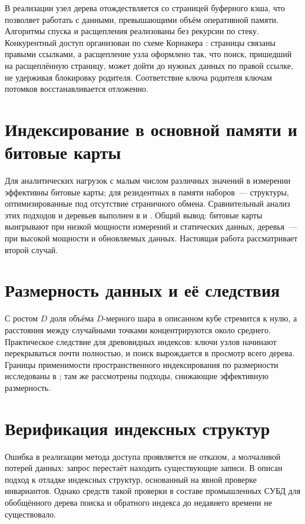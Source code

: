 В реализации \pg{} узел дерева отождествляется со страницей буферного кэша, что
позволяет работать с данными, превышающими объём оперативной памяти. Алгоритмы
спуска и расщепления реализованы без рекурсии по стеку. Конкурентный доступ
организован по схеме Корнакера \cite{kornacker1997concurrency}: страницы
связаны правыми ссылками, а расщепление узла оформлено так, что поиск,
пришедший на расщеплённую страницу, может дойти до нужных данных по правой
ссылке, не удерживая блокировку родителя. Соответствие ключа родителя ключам
потомков восстанавливается отложенно.

\section{Индексирование в основной памяти и битовые карты}

Для аналитических нагрузок с малым числом различных значений в измерении
эффективны битовые карты; для резидентных в памяти наборов~--- структуры,
оптимизированные под отсутствие страничного обмена. Сравнительный анализ этих
подходов и деревьев выполнен в \cite{borodin2011parallel} и
\cite{borodin2012monograph}. Общий вывод: битовые карты выигрывают при низкой
мощности измерений и статических данных, деревья~--- при высокой мощности и
обновляемых данных. Настоящая работа рассматривает второй случай.

\section{Размерность данных и её следствия}

С ростом $D$ доля объёма $D$-мерного шара в описанном кубе стремится к нулю, а
расстояния между случайными точками концентрируются около среднего. Практическое
следствие для древовидных индексов: ключи узлов начинают перекрываться почти
полностью, и поиск вырождается в просмотр всего дерева. Границы применимости
пространственного индексирования по размерности исследованы в
\cite{borodin2016highd}; там же рассмотрены подходы, снижающие эффективную
размерность.

\section{Верификация индексных структур}

Ошибка в реализации метода доступа проявляется не отказом, а молчаливой потерей
данных: запрос перестаёт находить существующие записи. В
\cite{borodin2016debug} описан подход к отладке индексных структур, основанный
на явной проверке инвариантов. Однако средств такой проверки в составе
промышленных СУБД для обобщённого дерева поиска и обратного индекса до недавнего
времени не существовало.

